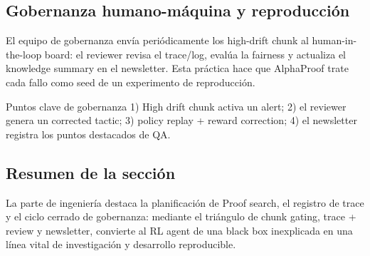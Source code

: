 \subsection{Gobernanza humano-máquina y reproducción}
El equipo de gobernanza envía periódicamente los high-drift chunk al human-in-the-loop board: el reviewer revisa el trace/log, evalúa la fairness y actualiza el knowledge summary en el newsletter. Esta práctica hace que AlphaProof trate cada fallo como seed de un experimento de reproducción.
\begin{knowledgebox}{Puntos clave de gobernanza}
1) High drift chunk activa un alert; 2) el reviewer genera un corrected tactic; 3) policy replay + reward correction; 4) el newsletter registra los puntos destacados de QA.
\end{knowledgebox}

\subsection{Resumen de la sección}
La parte de ingeniería destaca la planificación de Proof search, el registro de trace y el ciclo cerrado de gobernanza: mediante el triángulo de chunk gating, trace + review y newsletter, convierte al RL agent de una black box inexplicada en una línea vital de investigación y desarrollo reproducible.
\newpage

